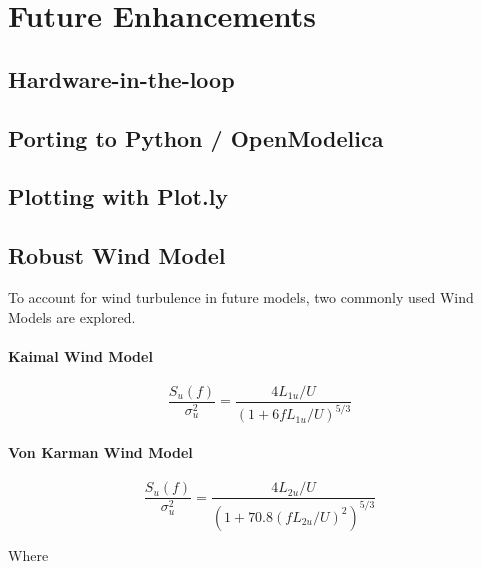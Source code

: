 \documentclass[]{book}
\begin{document}
\clearpage

\chapter{Future Enhancements}\label{future-enhancements}

\section{Hardware-in-the-loop}\label{hardware-in-the-loop}

\section{Porting to Python /
OpenModelica}\label{porting-to-python-openmodelica}

\section{Plotting with Plot.ly}\label{plotting-with-plot.ly}

\section{Robust Wind Model}\label{robust-wind-model}

To account for wind turbulence in future models, two commonly used Wind
Models are explored.

\subsubsection{Kaimal Wind Model}\label{kaimal-wind-model}

\begin{equation}
\label{eq_kaiman_wind_model}
\dfrac{S_u (f)}{\sigma ^2 _ u} = \dfrac{4 L_{1u} / U }{(1+6f L_{1u} / U )^{5/3}}
\end{equation}

\subsubsection{Von Karman Wind Model}\label{von-karman-wind-model}

\begin{equation}
\label{eq_von_karman_wind_model}
\dfrac{S_u (f)}{\sigma ^2 _ u} = \dfrac{4 L_{2u} / U }{(1+ 70.8 (fL_{2u} / U)^2 )^{5/3}}
\end{equation}

Where
\end{document}
